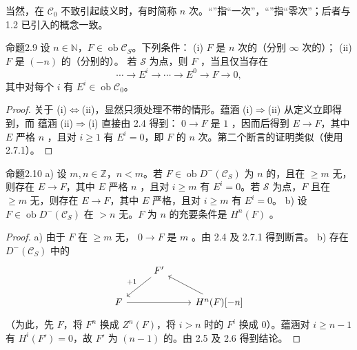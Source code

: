 当然，在 $\mathscr C_0$ 不致引起歧义时，有时简称 $n$ 次。“”指“一次”，“”指“零次”；后者与 1.2 已引入的概念一致。
\begin{SGAresult}{命题}{2.9}
设 $n\in\mathbb N$，$F\in\operatorname{ob}\mathscr C_S$。下列条件：
(i) $F$ 是 $n$ 次的（分别 $\infty$ 次的）；
(ii) $F$ 是 $(-n)$ 的（分别的）。
若 $\mathscr S$ 为点，则 $F$ ，当且仅当存在
\[\cdots\longrightarrow E^i\longrightarrow\cdots\longrightarrow E^0\longrightarrow F\longrightarrow0,\]
其中对每个 $i$ 有 $E^i\in\operatorname{ob}\mathscr C_0$。
\end{SGAresult}
\begin{proof}
关于 (i)$\Leftrightarrow$(ii)，显然只须处理不带的情形。蕴涵 (i)$\Rightarrow$(ii) 从定义立即得到，而
蕴涵 (ii)$\Rightarrow$(i) 直接由 2.4 得到： $0\to F$ 是 $1$ ，因而后得到 $E\to F$，其中 $E$ 严格 $n$ ，且对 $i\geq1$ 有 $E^i=0$，即 $F$ 的 $n$ 次。第二个断言的证明类似（使用 2.7.1）。
\end{proof}
\begin{SGAresult}{命题}{2.10}
a) 设 $m,n\in\mathbb Z$，$n<m$。若 $F\in\operatorname{ob}D^-(\mathscr C_S)$ 为 $n$ 的，且在 $\geq m$ 无，则存在 $E\to F$，其中 $E$ 严格 $n$ ，且对 $i\geq m$ 有 $E^i=0$。若 $\mathscr S$ 为点，$F$ 且在 $\geq m$ 无，则存在 $E\to F$，其中 $E$ 严格，且对 $i\geq m$ 有 $E^i=0$。
b) 设 $F\in\operatorname{ob}D^-(\mathscr C_S)$ 在 $>n$ 无。$F$ 为 $n$ 的充要条件是 $H^n(F)$ 。
\end{SGAresult}
\begin{proof}
a) 由于 $F$ 在 $\geq m$ 无， $0\to F$ 是 $m$ 。由 2.4 及 2.7.1 得到断言。
b) 存在 $D^-(\mathscr C_S)$ 中的
\[\begin{tikzcd}&F'\arrow[dl,"+1"']&\\F\arrow[rr]&&H^n(F)[-n]\arrow[ul]\end{tikzcd}\]
（为此，先 $F$，将 $F^n$ 换成 $Z^n(F)$，将 $i>n$ 时的 $F^i$ 换成 $0$）。蕴涵对 $i\geq n-1$ 有 $H^i(F')=0$，故 $F'$ 为 $(n-1)$ 的。由 2.5 及 2.6 得到结论。
\end{proof}
